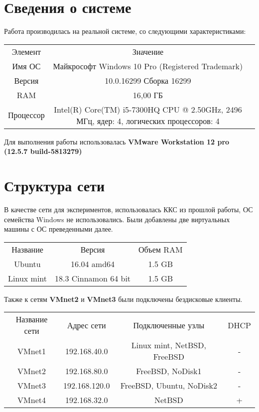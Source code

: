\documentclass[14pt,a4paper,report]{report}
\begin{document}
\section{Сведения о системе}
Работа производилась на реальной системе, со следующими характеристиками:

\begin{center}
\begin{tabular}{ c c c }
Элемент&Значение\\  
	
Имя ОС&Майкрософт Windows 10 Pro (Registered Trademark)\\ 
Версия&10.0.16299 Сборка 16299\\ 
RAM &16,00 ГБ\\ 
Процессор&Intel(R) Core(TM) i5-7300HQ CPU @ 2.50GHz, 2496 МГц, ядер: 4, логических процессоров: 4\\ 
\end{tabular}
\end{center}


Для выполнения работы использовалась \textbf{VMware Workstation 12 pro (12.5.7 build-5813279)}



\section{Структура сети}
В качестве сети для экспериментов, использовалась ККС из прошлой работы, ОС семейства Windows не использовались. Были добавлены две виртуальных машины с ОС преведенными далее.
\begin{center}
\begin{tabular}{ c c c }
Название&Версия&Объем RAM\\  
Ubuntu&16.04 amd64&1.5 GB\\ 
Linux mint&18.3 Cinnamon 64 bit&1.5 GB\\ 
\end{tabular}
\end{center}

Также к сетям \textbf{VMnet2} и \textbf{VMnet3} были подключены бездисковые клиенты.

\begin{center}
\begin{tabular}{ c c c c}
Название сети&Адрес сети&Подключенные узлы&DHCP\\  	
VMnet1&192.168.40.0&Linux mint, NetBSD, FreeBSD&-\\ 
VMnet2&192.168.80.0&FreeBSD, NoDisk1&-\\ 
VMnet3&192.168.120.0&FreeBSD, Ubuntu, NoDisk2&-\\ 
VMnet4&192.168.32.0&NetBSD&+\\ 
\end{tabular}
\end{center}
\end{document}
